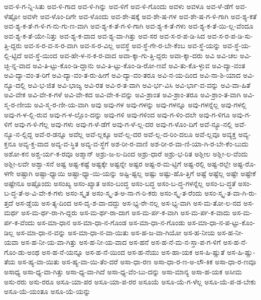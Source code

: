 {ಅವ-ಳಿ-ಗ-ನ್ನಿ-ಸಿತು
ಅವ-ಳಿ-ಗಾದ
ಅವ-ಳಿ-ಗಿನ್ನು
ಅವ-ಳಿಗೆ
ಅವ-ಳಿ-ಗೊಂದು
ಅವಳು
ಅವಳೂ
ಅವ-ಳೆ-ಡೆಗೆ
ಅವ-ಳೆಷ್ಟೋ
ಅವಳೇ
ಅವ-ಳೊಂ-ದಿಗೇ
ಅವ-ಳೊಂದು
ಅವ-ಶೇ-ಷಕ್ಕೆ
ಅವ-ಶೇ-ಷ-ಗಳ
ಅವ-ಶೇ-ಷ-ಗ-ಳಿ-ಗಾಗಿ
ಅವ-ಶ್ಯ-ಕತೆ
ಅವ-ಶ್ಯ-ಕ-ತೆ-ಗ-ಳಿ-ಗ-ನು-ಗು-ಣ-ವಾಗಿ
ಅವ-ಶ್ಯ-ಕ-ತೆ-ಗ-ಳಿ-ಗಾಗಿ
ಅವ-ಶ್ಯ-ಕ-ತೆ-ಗಳು
ಅವ-ಶ್ಯ-ಕ-ತೆ-ಯಿ-ಲ್ಲ-ವೆಂದೂ
ಅವ-ಶ್ಯ-ಕ-ತೆ-ಯೇ-ನಿತ್ತು
ಅವ-ಶ್ಯ-ಕ-ವಾದ
ಅವ-ಶ್ಯ-ವಾ-ಗಿತ್ತು
ಅವ-ಸರ
ಅವ-ಸ-ರ-ಪ-ಡಿ-ಸಿದ
ಅವ-ಸ-ರ-ಪ-ಡಿ-ಸು-ತ್ತಿ-ದ್ದರು
ಅವ-ಸ-ರ-ವ-ಸ-ರ-ವಾಗಿ
ಅವ-ಸ-ರ-ವಿಲ್ಲ
ಅವಸ್ಥೆ
ಅವ-ಸ್ಥೆ-ಗೇ-ರ-ಬೇ-ಕೆಂಬ
ಅವ-ಸ್ಥೆ-ಯನ್ನು
ಅವ-ಸ್ಥೆ-ಯ-ಲ್ಲಿ-ಟ್ಟಿದೆ
ಅವ-ಸ್ಥೆ-ಯಿಂದ
ಅವ-ಹೇ-ಳ-ನ-ಕ-ರ-ವಾದ
ಅವಾ-ಕ್ಕಾ-ಗು-ತ್ತಿ-ದ್ದರು
ಅವಾ-ಕ್ಕಾ-ದರು
ಅವಿ
ಅವಿ-ಚಲ
ಅವಿ-ಚ್ಛಿ-ನ್ನ-ವಾದ
ಅವಿ-ತಿ-ಟ್ಟು-ಕೊಂ-ಡಿ-ದ್ದಾನು
ಅವಿ-ತಿ-ಟ್ಟು-ಕೊಂ-ಡಿ-ರೋ-ಣವೆ
ಅವಿ-ತು-ಕೊ-ಳ್ಳುವ
ಅವಿ-ದ್ಯಾ-ವಂತ
ಅವಿ-ದ್ಯಾ-ವಂ-ತ-ರಿಗೆ
ಅವಿ-ದ್ಯಾ-ವಂ-ತ-ರು-ಹೀಗೆ
ಅವಿ-ದ್ಯಾ-ವಂ-ತರೂ
ಅವಿ-ನ-ಯ-ದಿಂದ
ಅವಿ-ನಾ-ಶಿ-ಯಾದ
ಅವಿ-ನ್ಯೂ-ದಲ್ಲಿ
ಅವಿ-ಭ-ಜಿತ
ಅವಿ-ಭಾಜ್ಯ
ಅವಿ-ರತ
ಅವಿ-ರ-ತ-ವಾಗಿ
ಅವಿ-ರ್ಭ-ವಿಸಿ
ಅವಿ-ರ್ಭಾ-ವ-ವನ್ನು
ಅವಿ-ವಾ-ಹಿತೆ
ಅವಿ-ವೇಕ
ಅವಿ-ವೇ-ಕ-ಗಳೆ
ಅವಿ-ವೇ-ಕದ
ಅವಿ-ವೇ-ಕ-ವನ್ನು
ಅವಿ-ಶ್ರಾಂತ
ಅವಿ-ಶ್ರಾಂ-ತರೂ
ಅವಿ-ಶ್ರಾಂ-ತ-ವಾಗಿ
ಅವಿ-ಸ್ಮ-ರ-ಣೀಯ
ಅವಿ-ಸ್ಮ-ರ-ಣೀ-ಯ-ವಾಗಿ
ಅವು
ಅವು-ಗಳ
ಅವು-ಗಳನ್ನು
ಅವು-ಗಳನ್ನೂ
ಅವು-ಗಳನ್ನೆಲ್ಲ
ಅವು-ಗಳಲ್ಲಿ
ಅವು-ಗ-ಳ-ಲ್ಲಿ-ರುವ
ಅವು-ಗ-ಳ-ಲ್ಲೊಂ-ದನ್ನು
ಅವು-ಗಳಿ
ಅವು-ಗಳಿಂದ
ಅವು-ಗ-ಳಿಂ-ದಲೇ
ಅವು-ಗ-ಳಿಗೂ
ಅವು-ಗ-ಳಿಗೆ
ಅವು-ಗ-ಳಿ-ಗೆಲ್ಲ
ಅವು-ಗಳು
ಅವು-ಗ-ಳೆ-ಡೆಗೆ
ಅವು-ಗ-ಳೆ-ಲ್ಲ-ದರ
ಅವು-ಗ-ಳೊಂ-ದಿಗೆ
ಅವೆ-ನ್ಯೂ-ನಲ್ಲಿ
ಅವೆ-ನ್ಯೂ-ನ-ಲ್ಲಿದ್ದ
ಅವೆ-ರ-ಡನ್ನೂ
ಅವೆಲ್ಲ
ಅವೆ-ಲ್ಲಕ್ಕೂ
ಅವೆ-ಲ್ಲ-ದರ
ಅವೆ-ಲ್ಲ-ದ-ರಿಂ-ದಲೂ
ಅವೆ-ಲ್ಲವೂ
ಅವ್ಯಕ್ತ
ಅವ್ಯ-ಕ್ತನೂ
ಅವ್ಯ-ಕ್ತ-ವಾದ
ಅವ್ಯ-ವ-ಸ್ಥಿತ
ಅವ್ಯ-ವ-ಸ್ಥೆಗೆ
ಅಶ-ರೀ-ರ-ವಾಣಿ
ಅಶ-ರೀ-ರ-ವಾ-ಣಿ-ಯಾ-ಗಿ-ರ-ಬೇ-ಕೆಂ-ಬುದು
ಅಶೋ-ಕನ
ಅಶ್ಚ-ರ್ಯ-ಕ-ರವೂ
ಅಶ್ಮಾನ್
ಅಶ್ರು-ಜ-ಲ-ದಿಂದ
ಅಶ್ರು-ಧಾರೆ
ಅಶ್ರು-ಭ-ರಿತ
ಅಶ್ಲೀಲ
ಅಶ್ಲೀ-ಲ-ವೆಂದು
ಅಶ್ಲೀ-ಲವೇ
ಅಶ್ವಾ-ಸನೆ
ಅಷ್ಟ
ಅಷ್ಟ-ಕಷ್ಟೆ
ಅಷ್ಟಕ್ಕೇ
ಅಷ್ಟನ್ನೇ
ಅಷ್ಟರ
ಅಷ್ಟ-ರ-ಮ-ಟ್ಟಿಗೆ
ಅಷ್ಟ-ರಲ್ಲಿ
ಅಷ್ಟ-ರಲ್ಲೇ
ಅಷ್ಟ-ರೊ-ಳಗೇ
ಅಷ್ಟಾಗಿ
ಅಷ್ಟಾ-ಧ್ಯಾಯಿ
ಅಷ್ಟಾ-ಧ್ಯಾ-ಯಿ-ಯನ್ನು
ಅಷ್ಟಿ-ಷ್ಟಲ್ಲ
ಅಷ್ಟು
ಅಷ್ಟು-ಹೊ-ತ್ತಿಗೆ
ಅಷ್ಟೆ
ಅಷ್ಟೆಲ್ಲ
ಅಷ್ಟೇ
ಅಷ್ಟೇಕೆ
ಅಷ್ಟೇನೂ
ಅಷ್ಟೊಂದು
ಅಸಂಖ್ಯ
ಅಸಂ-ಖ್ಯಾತ
ಅಸಂ-ಬಂದ್ಧ
ಅಸಂ-ಬದ್ಧ
ಅಸಂ-ಬ-ದ್ಧ-ಗಳನ್ನೆಲ್ಲ
ಅಸಂ-ಬ-ದ್ಧತೆ
ಅಸಂ-ಬ-ದ್ಧ-ತೆ-ಅ-ವಿ-ವೇ-ಕ-ಗಳು
ಅಸಂ-ಸ್ಕೃತ
ಅಸಂ-ಸ್ಕೃ-ತ-ಅ-ನಾ-ಗ-ರಿ-ಕರು
ಅಸಂ-ಸ್ಕೃ-ತ-ರೆಂದು
ಅಸಂ-ಸ್ಕೃ-ತ-ವಾ-ಗಿ-ರು-ತ್ತದೆ
ಅಸ-ಡ್ಡೆಯ
ಅಸ-ತ್ಯ-ದಿಂದ
ಅಸ-ದೃ-ಶ-ವಾ-ದದ್ದು
ಅಸ-ಭ್ಯ-ರೇ-ನಲ್ಲ
ಅಸ-ಭ್ಯ-ವಾಗಿ
ಅಸ-ಮ-ತೋ-ಲ-ನದ
ಅಸ-ಮರ್ಥ
ಅಸ-ಮ-ರ್ಥ-ರಾ-ಗಿ-ದ್ದರು
ಅಸ-ಮ-ರ್ಥ-ರಾ-ದಾಗ
ಅಸ-ಮ-ರ್ಪ-ಕ-ವಾಗಿ
ಅಸ-ಮ-ರ್ಪ-ಕ-ವಾದು
ಅಸ-ಮ-ರ್ಪ-ಕ-ವೆಂದು
ಅಸ-ಮಾ-ಧಾನ
ಅಸ-ಮಾ-ಧಾ-ನ-ಗೊಂಡ
ಅಸ-ಮಾ-ಧಾ-ನ-ಗೊಂಡು
ಅಸ-ಮಾ-ಧಾ-ನ-ಪ-ಟ್ಟು-ಕೊಂ-ಡಿಲ್ಲ
ಅಸ-ಮಾ-ಧಾ-ನ-ವನ್ನು
ಅಸ-ಮಾ-ಧಾ-ನ-ವಾ-ಯಿತು
ಅಸ-ಹ-ಜ-ವಾ-ಗಿಯೋ
ಅಸ-ಹ-ನೀಯ
ಅಸ-ಹ-ನೀ-ಯವಾ
ಅಸ-ಹ-ನೀ-ಯ-ವಾ-ಗಿತ್ತು
ಅಸ-ಹ-ನೀ-ಯ-ವಾದ
ಅಸ-ಹನೆ
ಅಸ-ಹ-ನೆ-ಮ-ನ-ಸ್ತಾ-ಪ-ಗ-ಳಿಗೆ
ಅಸ-ಹ-ನೆ-ಗೊಂ-ಡು-ಅಂಥ
ಅಸ-ಹ-ನೆ-ಯನ್ನೂ
ಅಸ-ಹ-ನೆ-ಯಿಂದ
ಅಸ-ಹ-ನೆಯು
ಅಸ-ಹಾ-ಯಕ
ಅಸ-ಹಿ-ಷ್ಣುತೆ
ಅಸ-ಹಿ-ಷ್ಣು-ತೆಯ
ಅಸ-ಹ್ಯ-ವಾ-ಯಿತು
ಅಸ-ಹ್ಯ-ವಾ-ಯಿ-ತೆಂ-ದರೆ
ಅಸಾ-ಧಾ-ರಣ
ಅಸಾ-ಧಾ-ರ-ಣ-ಅ-ಲೌ-ಕಿಕ
ಅಸಾ-ಧಾ-ರ-ಣವೂ
ಅಸಾಧ್ಯ
ಅಸಾ-ಧ್ಯ-ವಾ-ಗಿತ್ತು
ಅಸಾ-ಧ್ಯ-ವಾ-ಗಿದೆ
ಅಸಾ-ಧ್ಯ-ವೆಂ-ಬು-ದನ್ನು
ಅಸಾ-ಮಾನ್ಯ
ಅಸಾ-ಹ-ಯಕ
ಅಸೀಮ
ಅಸು-ರರು
ಅಸು-ರರೂ
ಅಸೂ-ಯಾ-ಪರ
ಅಸೂ-ಯಾ-ಪ-ರರ
ಅಸೂಯೆ
ಅಸೂ-ಯೆ-ಗ-ಳೆಲ್ಲ
ಅಸೂ-ಯೆ-ಪ-ಡ-ಬೇಕು
ಅಸೂ-ಯೆ-ಯಂತೂ
ಅಸೂ-ಯೆ-ಯನ್ನು
}
